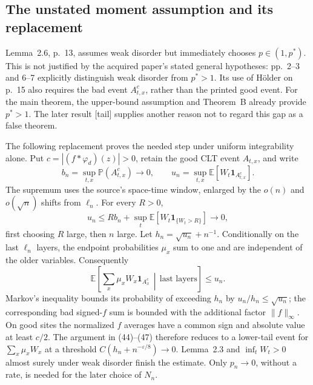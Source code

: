 \documentclass[10pt]{article}
\begin{document}
\subsection*{The unstated moment assumption and its replacement}
Lemma 2.6, p. 13, assumes weak disorder but immediately chooses \(p\in(1,p^*)\). This is not justified by the acquired paper’s stated general hypotheses: pp. 2–3 and 6–7 explicitly distinguish weak disorder from \(p^*>1\). Its use of Hölder on p. 15 also requires the bad event \(A_{t,x}^c\), rather than the printed good event. For the main theorem, the upper-bound assumption and Theorem B already provide \(p^*>1\). The later result [tail] supplies another reason not to regard this gap as a false theorem.\par
The following replacement proves the needed step under uniform integrability alone. Put \(c=|(f*\varphi_d)(z)|>0\), retain the good CLT event \(A_{t,x}\), and write \[b_n=\sup_{t,x}\mathbb P(A_{t,x}^c)\longrightarrow0,\qquad
 u_n=\sup_{t,x}\mathbb E[W_t\mathbf1_{A_{t,x}^c}].\] The supremum uses the source’s space-time window, enlarged by the \(o(n)\) and \(o(\sqrt n)\) shifts from \(\ell_n\). For every \(R>0\), \[u_n\leq Rb_n+\sup_t\mathbb E[W_t\mathbf1_{\{W_t>R\}}]\longrightarrow0,\] first choosing \(R\) large, then \(n\) large. Let \(h_n=\sqrt{u_n}+n^{-1}\). Conditionally on the last \(\ell_n\) layers, the endpoint probabilities \(\mu_x\) sum to one and are independent of the older variables. Consequently \[\mathbb E\!\left[\sum_x\mu_xW_x\mathbf1_{A_x^c}\,\middle|\,
             \text{last layers}\right]\leq u_n .\] Markov’s inequality bounds its probability of exceeding \(h_n\) by \(u_n/h_n\leq\sqrt{u_n}\); the corresponding bad signed-\(f\) sum is bounded with the additional factor \(\|f\|_\infty\). On good sites the normalized \(f\) averages have a common sign and absolute value at least \(c/2\). The argument in (44)–(47) therefore reduces to a lower-tail event for \(\sum_x\mu_xW_x\) at a threshold \(C(h_n+n^{-\varepsilon/8})\to0\). Lemma 2.3 and \(\inf_tW_t>0\) almost surely under weak disorder finish the estimate. Only \(p_n\to0\), without a rate, is needed for the later choice of \(N_n\).\par
\end{document}
